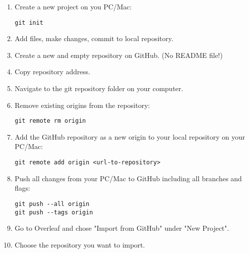 \documentclass{report}
\begin{document}
\begin{enumerate}[noitemsep]
    \item Create a new project on you PC/Mac:
    \begin{verbatim}
git init
    \end{verbatim}
    \item Add files, make changes, commit to local repository.
    \item Create a new and empty repository on GitHub. (No README file!)
    \item Copy repository address.
    \item Navigate to the git repository folder on your computer. 
    \item Remove existing origins from the repository:
    \begin{verbatim}
git remote rm origin
    \end{verbatim}
    \item Add the GitHub repository as a new origin to your local repository on your PC/Mac:
    \begin{verbatim}
git remote add origin <url-to-repository>
    \end{verbatim}
    \item Push all changes from your PC/Mac to GitHub including all branches and flags:
    \begin{verbatim}
git push --all origin
git push --tags origin
    \end{verbatim}
    \item Go to Overleaf and chose "Import from GitHub" under "New Project".
    \item Choose the repository you want to import.
\end{enumerate}
\end{document}
